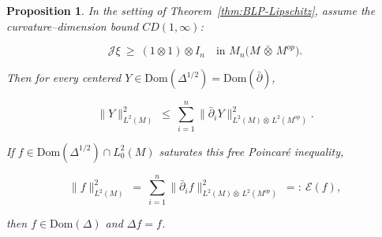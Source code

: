 \documentclass[10pt,a4paper,reqno]{amsart}
\newtheorem{proposition}[theorem]{Proposition}
\newcommand{\Dom}{\mathrm{Dom}}
\begin{document}
\begin{proposition}\label{prop1}
In the setting of Theorem~\ref{thm:BLP-Lipschitz}, assume the curvature--dimension bound $CD(1,\infty)$:


\[
\mathscr{J}\xi\ \ge\ (1\otimes 1)\otimes I_n
\quad\text{in } M_n\!\big(M\,\bar\otimes\,M^{op}\big).
\]



Then for every centered $Y\in \Dom(\Delta^{1/2})=\Dom(\bar{\partial})$,


\[
\|Y\|_{L^2(M)}^2\ \le\ \sum_{i=1}^n \|\bar{\partial}_i Y\|_{L^2(M){\bar\otimes}\,L^2(M^{op})}^2.
\]



If $f\in \Dom(\Delta^{1/2})\cap L^2_0(M)$ saturates this free Poincaré inequality,


\[
\|f\|_{L^2(M)}^2\ =\ \sum_{i=1}^n \|\bar{\partial}_i f\|_{L^2(M){\bar\otimes}\,L^2(M^{op})}^2\ =:\ \mathcal{E}(f),
\]


then $f\in \Dom(\Delta)$ and $\Delta f=f$.
\end{proposition}
\end{document}
